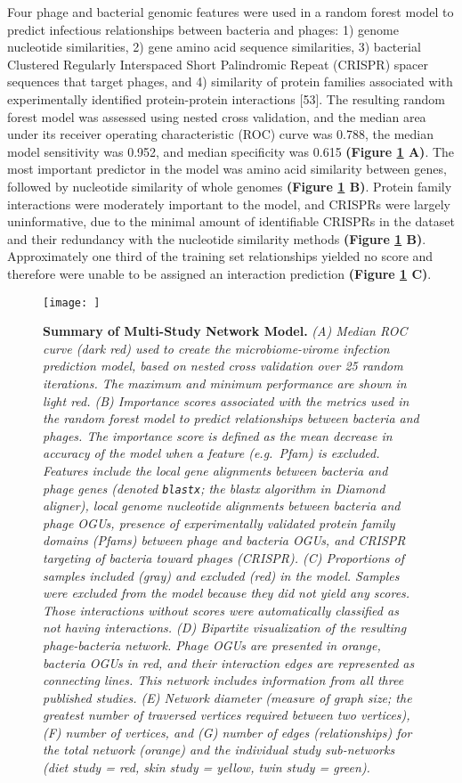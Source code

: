 \documentclass[12pt,]{article}
\begin{document}
Four phage and bacterial genomic features were used in a random forest
model to predict infectious relationships between bacteria and phages:
1) genome nucleotide similarities, 2) gene amino acid sequence
similarities, 3) bacterial Clustered Regularly Interspaced Short
Palindromic Repeat (CRISPR) spacer sequences that target phages, and 4)
similarity of protein families associated with experimentally identified
protein-protein interactions {[}53{]}. The resulting random forest model
was assessed using nested cross validation, and the median area under
its receiver operating characteristic (ROC) curve was 0.788, the median
model sensitivity was 0.952, and median specificity was 0.615
\textbf{(Figure \ref{RocCurve} A)}. The most important predictor in the
model was amino acid similarity between genes, followed by nucleotide
similarity of whole genomes \textbf{(Figure \ref{RocCurve} B)}. Protein
family interactions were moderately important to the model, and CRISPRs
were largely uninformative, due to the minimal amount of identifiable
CRISPRs in the dataset and their redundancy with the nucleotide
similarity methods \textbf{(Figure \ref{RocCurve} B)}. Approximately one
third of the training set relationships yielded no score and therefore
were unable to be assigned an interaction prediction \textbf{(Figure
\ref{RocCurve} C)}.

\begin{figure}[htbp]
\centering
\texttt{[image: ]}
\caption{\textbf{Summary of Multi-Study Network Model.} \emph{(A) Median
ROC curve (dark red) used to create the microbiome-virome infection
prediction model, based on nested cross validation over 25 random
iterations. The maximum and minimum performance are shown in light red.
(B) Importance scores associated with the metrics used in the random
forest model to predict relationships between bacteria and phages. The
importance score is defined as the mean decrease in accuracy of the
model when a feature (e.g.~Pfam) is excluded. Features include the local
gene alignments between bacteria and phage genes (denoted
\texttt{blastx}; the blastx algorithm in Diamond aligner), local genome
nucleotide alignments between bacteria and phage OGUs, presence of
experimentally validated protein family domains (Pfams) between phage
and bacteria OGUs, and CRISPR targeting of bacteria toward phages
(CRISPR). (C) Proportions of samples included (gray) and excluded (red)
in the model. Samples were excluded from the model because they did not
yield any scores. Those interactions without scores were automatically
classified as not having interactions. (D) Bipartite visualization of
the resulting phage-bacteria network. Phage OGUs are presented in
orange, bacteria OGUs in red, and their interaction edges are
represented as connecting lines. This network includes information from
all three published studies. (E) Network diameter (measure of graph
size; the greatest number of traversed vertices required between two
vertices), (F) number of vertices, and (G) number of edges
(relationships) for the total network (orange) and the individual study
sub-networks (diet study = red, skin study = yellow, twin study =
green).} \label{RocCurve}}
\end{figure}
\end{document}
